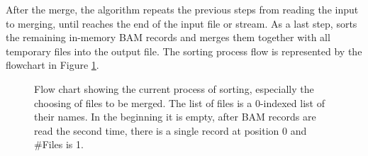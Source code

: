 After the merge, the algorithm repeats the previous steps from reading the input to merging, until \sort reaches the end of the input file or stream. As a last step, \sort sorts the remaining in-memory BAM records and merges them together with all temporary files into the output file.
The sorting process flow is represented by the flowchart in Figure \ref{fig:flow}.

\begin{figure}[ht]
    \begin{adjustbox}{width=\linewidth}
        
    \end{adjustbox}
    \caption{Flow chart showing the current process of sorting, especially the choosing of files to be merged. The list of files is a 0-indexed list of their names. In the beginning it is empty, after BAM records are read the second time, there is a single record at position 0 and \#Files is 1.}
    \label{fig:flow}
\end{figure}